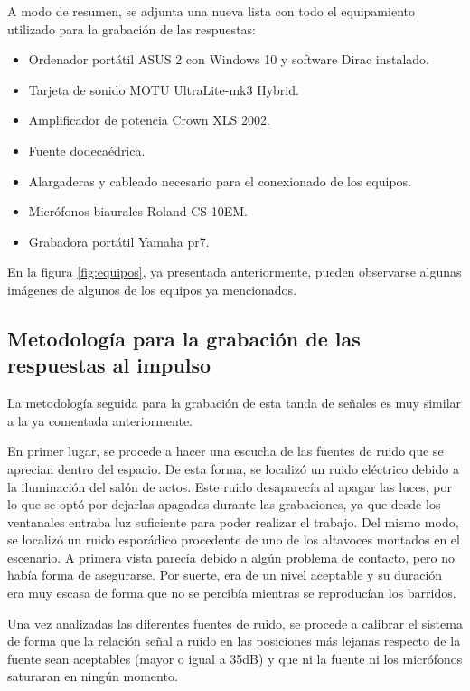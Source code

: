\documentclass[11pt,a4paper,twoside]{book}
\begin{document}
            A modo de resumen, se adjunta una nueva lista con todo el equipamiento utilizado para la grabación de las respuestas:
                
            \begin{itemize}
                \item Ordenador portátil ASUS 2 con Windows 10 y software Dirac instalado.
	            \item Tarjeta de sonido MOTU UltraLite-mk3 Hybrid.
	            \item Amplificador de potencia Crown XLS 2002.
	            \item Fuente dodecaédrica.
	            \item Alargaderas y cableado necesario para el conexionado de los equipos.
	            \item Micrófonos biaurales Roland CS-10EM.
	            \item Grabadora portátil Yamaha pr7.
            \end{itemize}
                
            En la figura \ref{fig:equipos}, ya presentada anteriormente, pueden observarse algunas imágenes de algunos de los equipos ya mencionados.
                
        \subsection{Metodología para la grabación de las respuestas al impulso}
            La metodología seguida para la grabación de esta tanda de señales es muy similar a la ya comentada anteriormente.
                
            En primer lugar, se procede a hacer una escucha de las fuentes de ruido que se aprecian dentro del espacio. De esta forma, se localizó un ruido eléctrico debido a la iluminación del salón de actos. Este ruido desaparecía al apagar las luces, por lo que se optó por dejarlas apagadas durante las grabaciones, ya que desde los ventanales entraba luz suficiente para poder realizar el trabajo. Del mismo modo, se localizó un ruido esporádico procedente de uno de los altavoces montados en el escenario. A primera vista parecía debido a algún problema de contacto, pero no había forma de asegurarse. Por suerte, era de un nivel aceptable y su duración era muy escasa de forma que no se percibía mientras se reproducían los barridos.
                
            Una vez analizadas las diferentes fuentes de ruido, se procede a calibrar el sistema de forma que la relación señal a ruido en las posiciones más lejanas respecto de la fuente sean aceptables (mayor o igual a 35dB) y que ni la fuente ni los micrófonos saturaran en ningún momento.
                
\end{document}
